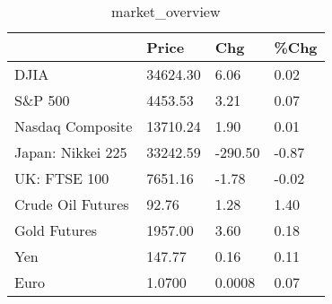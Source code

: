 \documentclass{article}%
\begin{document}
%


\begin{table}[htbp]%
\caption{market\_overview}%
\centering%
\begin{adjustbox}{width=1\textwidth}%
\begin{tabular}{llll}
\toprule
                  &    Price &     Chg &  \%Chg \\
\midrule
             DJIA & 34624.30 &    6.06 &  0.02 \\
          S\&P 500 &  4453.53 &    3.21 &  0.07 \\
 Nasdaq Composite & 13710.24 &    1.90 &  0.01 \\
Japan: Nikkei 225 & 33242.59 & -290.50 & -0.87 \\
     UK: FTSE 100 &  7651.16 &   -1.78 & -0.02 \\
Crude Oil Futures &    92.76 &    1.28 &  1.40 \\
     Gold Futures &  1957.00 &    3.60 &  0.18 \\
              Yen &   147.77 &    0.16 &  0.11 \\
             Euro &   1.0700 &  0.0008 &  0.07 \\
\bottomrule
\end{tabular}
%
\end{adjustbox}%
\end{table}

%
\end{document}
